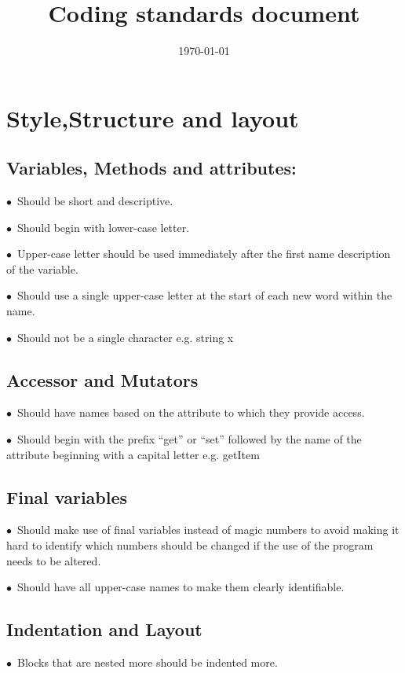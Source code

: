 \documentclass[english]{article}
\title{Coding standards document\\}
\date{\today}
\begin{document}
	\maketitle
	


	\section{Style,Structure and layout}
			

		\subsection{Variables, Methods and attributes:}
			$\bullet$\ Should be short and descriptive.\par
			$\bullet$\ Should begin with lower-case letter.\par
$\bullet$\ Upper-case letter should be used immediately after the first name description of the variable.\par
$\bullet$\ Should use a single upper-case letter at the start of each new word within the name.\par
$\bullet$\ Should not be a single character e.g. string x  \par


                                	

		\subsection{Accessor and Mutators}
$\bullet$\  Should have names based on the attribute to which they provide access.\par
$\bullet$\ Should begin with the prefix “get” or “set” followed by the name of the attribute beginning with a capital letter e.g. getItem \par

		\subsection{Final variables}
		$\bullet$\ Should make use of final variables instead of magic numbers to avoid making it hard to identify which numbers should be changed if the use of the program needs to be altered.\par
			$\bullet$\ Should have all upper-case names to make them clearly identifiable.\par		
				
				
		\subsection{Indentation and Layout}
		$\bullet$\ Blocks that are nested more should be indented more. \par
		
\end{document}

